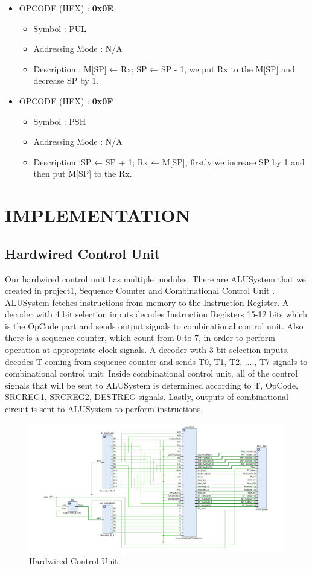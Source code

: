 \documentclass[pdftex,12pt,a4paper]{article}
\begin{document}
\begin{itemize}
    \item OPCODE (HEX) : \textbf{0x0E}
        \begin{itemize}
            \item Symbol : PUL 
            \item Addressing Mode : N/A
            \item Description : M[SP] ← Rx; SP ← SP - 1, we put Rx to the M[SP] and decrease SP by 1.
        \end{itemize}    
    \item OPCODE (HEX) : \textbf{0x0F}  
        \begin{itemize}
            \item Symbol : PSH
            \item Addressing Mode : N/A
            \item Description :SP ← SP + 1; Rx ← M[SP], firstly we increase SP by 1 and then put M[SP] to the Rx.
        \end{itemize}    

    \end{itemize}
    
\section{IMPLEMENTATION} 
\subsection{Hardwired Control Unit}
Our hardwired control unit has multiple modules. There are ALUSystem that we created in project1, Sequence Counter and Combinational Control Unit . ALUSystem fetches instructions from memory to the Instruction Register. A decoder with 4 bit selection inputs decodes Instruction Registers 15-12 bits which is the OpCode part and sends output signals to combinational control unit. Also there is a sequence counter, which count from 0 to 7, in order to perform operation at appropriate clock signals. A decoder with 3 bit selection inputs, decodes T coming from sequence counter and sends T0, T1, T2, ...., T7 signals to combinational control unit. Inside combinational control unit, all of the control signals that will be sent to ALUSystem is determined according to T, OpCode, SRCREG1, SRCREG2, DESTREG signals. Lastly, outputs of combinational circuit is sent to ALUSystem to perform instructions.
\begin{figure}[ht]
	\centering
	\includegraphics[width=1\textwidth]{HardwiredControlUnit.png}	
	\caption{Hardwired Control Unit}
	\label{fig1}
\end{figure}
\end{document}

